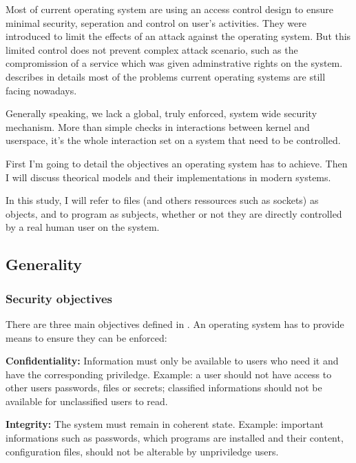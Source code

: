 \documentclass[pdftex,a4paper,titlepage,11pt]{article}
\begin{document}
\smallskip

Most of current operating system are using an access control design to ensure
minimal security, seperation and control on user's activities. They were
introduced to limit the effects of an attack against the operating system. But
this limited control does not prevent complex attack scenario, such as the
compromission of a service which was given adminstrative rights on the system.
\cite{NSATIOF} describes in details most of the problems current operating
systems are still facing nowadays.

\bigskip

Generally speaking, we lack a global, truly enforced, system wide security
mechanism. More than simple checks in interactions between kernel and userspace,
it's the whole interaction set on a system that need to be controlled.

\bigskip

First I'm going to detail the objectives an operating system has to achieve.
Then I will discuss theorical models and their implementations in modern
systems.

\bigskip

In this study, I will refer to files (and others ressources such as sockets) as
objects, and to program as subjects, whether or not they are directly controlled
by a real human user on the system.

\subsection{Generality}

\subsubsection{Security objectives}

There are three main objectives defined in \cite{SECOBJ}. An operating  system
has to provide means to ensure they can be enforced:

\bigskip

\textbf{Confidentiality:}
Information must only be available to users who need it and have the
corresponding priviledge. Example: a user should not have access to other users
passwords, files or secrets; classified informations should not be available for
unclassified users to read.

\medskip

\textbf{Integrity:}
The system must remain in coherent state. Example: important informations such
as passwords, which programs are installed and their content, configuration
files, should not be alterable by unpriviledge users.
\end{document}
